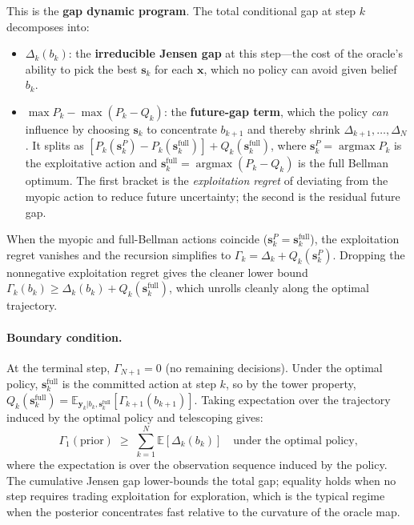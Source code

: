 \documentclass[11pt,a4paper]{article}
\newcommand{\E}{\mathbb{E}}
\newcommand{\argmax}{\operatorname{argmax}}
\begin{document}
This is the \textbf{gap dynamic program}.  The total conditional gap at step $k$ decomposes into:
\begin{itemize}[nosep]
  \item $\Delta_k(b_k)$: the \textbf{irreducible Jensen gap} at this step---the cost of the oracle's ability to pick the best $\bm{s}_k$ for each $\bm{x}$, which no policy can avoid given belief $b_k$.
  \item $\max P_k - \max(P_k - Q_k)$: the \textbf{future-gap term}, which the policy \emph{can} influence by choosing $\bm{s}_k$ to concentrate $b_{k+1}$ and thereby shrink $\Delta_{k+1}, \ldots, \Delta_N$.  It splits as $[P_k(\bm{s}_k^P) - P_k(\bm{s}_k^{\text{full}})] + Q_k(\bm{s}_k^{\text{full}})$, where $\bm{s}_k^P = \argmax P_k$ is the exploitative action and $\bm{s}_k^{\text{full}} = \argmax(P_k - Q_k)$ is the full Bellman optimum.  The first bracket is the \emph{exploitation regret} of deviating from the myopic action to reduce future uncertainty; the second is the residual future gap.
\end{itemize}

When the myopic and full-Bellman actions coincide ($\bm{s}_k^P = \bm{s}_k^{\text{full}}$), the exploitation regret vanishes and the recursion simplifies to $\Gamma_k = \Delta_k + Q_k(\bm{s}_k^P)$.  Dropping the nonnegative exploitation regret gives the cleaner lower bound $\Gamma_k(b_k) \ge \Delta_k(b_k) + Q_k(\bm{s}_k^{\text{full}})$, which unrolls cleanly along the optimal trajectory.

\paragraph{Boundary condition.}
At the terminal step, $\Gamma_{N+1} = 0$ (no remaining decisions).  Under the optimal policy, $\bm{s}_k^{\text{full}}$ is the committed action at step $k$, so by the tower property, $Q_k(\bm{s}_k^{\text{full}}) = \E_{\bm{y}_k|b_k,\bm{s}_k^{\text{full}}}[\Gamma_{k+1}(b_{k+1})]$.  Taking expectation over the trajectory induced by the optimal policy and telescoping gives:
\begin{equation}
  \Gamma_1(\text{prior}) \;\geq\; \sum_{k=1}^{N} \E\!\left[\Delta_k(b_k)\right] \quad \text{under the optimal policy,}
  \label{eq:gap_sum}
\end{equation}
where the expectation is over the observation sequence induced by the policy.  The cumulative Jensen gap lower-bounds the total gap; equality holds when no step requires trading exploitation for exploration, which is the typical regime when the posterior concentrates fast relative to the curvature of the oracle map.
\end{document}
